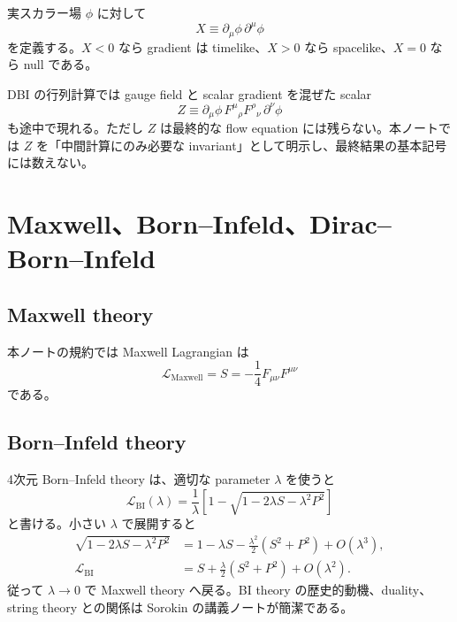 \documentclass[a4paper,11pt]{ltjsreport}
\newcommand{\Lag}{\mathcal L}
\begin{document}
実スカラー場 $\phi$ に対して
\begin{equation}
 X\equiv\partial_\mu\phi\,\partial^\mu\phi
 \label{eq:Xdef}
\end{equation}
を定義する。$X<0$ なら gradient は timelike、$X>0$ なら spacelike、$X=0$ なら null である。

DBI の行列計算では gauge field と scalar gradient を混ぜた scalar
\begin{equation}
 Z\equiv
 \partial_\mu\phi\,
 F^\mu{}_{\rho}F^\rho{}_{\nu}\,
 \partial^\nu\phi
 \label{eq:Zdef}
\end{equation}
も途中で現れる。ただし $Z$ は最終的な flow equation には残らない。本ノートでは $Z$ を「中間計算にのみ必要な invariant」として明示し、最終結果の基本記号には数えない。

\section{Maxwell、Born--Infeld、Dirac--Born--Infeld}

\subsection{Maxwell theory}

本ノートの規約では Maxwell Lagrangian は
\begin{equation}
 \Lag_{\mathrm{Maxwell}}=S=-\frac14F_{\mu\nu}F^{\mu\nu}
\end{equation}
である。

\subsection{Born--Infeld theory}

4次元 Born--Infeld theory は、適切な parameter $\lambda$ を使うと
\begin{equation}
 \Lag_{\mathrm{BI}}(\lambda)
 =\frac{1}{\lambda}
 \left[1-\sqrt{1-2\lambda S-\lambda^2P^2}\right]
 \label{eq:BI-SP}
\end{equation}
と書ける。小さい $\lambda$ で展開すると
\begin{align}
 \sqrt{1-2\lambda S-\lambda^2P^2}
 &=1-\lambda S-\frac{\lambda^2}{2}(S^2+P^2)+O(\lambda^3),\\
 \Lag_{\mathrm{BI}}
 &=S+\frac{\lambda}{2}(S^2+P^2)+O(\lambda^2).
 \label{eq:BI-expand}
\end{align}
従って $\lambda\to0$ で Maxwell theory へ戻る。BI theory の歴史的動機、duality、string theory との関係は Sorokin の講義ノート\cite{Sorokin2021}が簡潔である。
\end{document}
